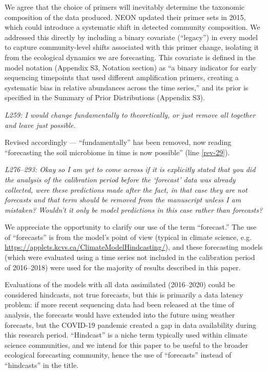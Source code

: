 \documentclass[11pt]{article}
\begin{document}
We agree that the choice of primers will inevitably determine the taxonomic composition of the data produced. NEON updated their primer sets in 2015, which could introduce a systematic shift in detected community composition. We addressed this directly by including a binary covariate (``legacy'') in every model to capture community-level shifts associated with this primer change, isolating it from the ecological dynamics we are forecasting. This covariate is defined in the model notation (Appendix S3, Notation section) as ``a binary indicator for early sequencing timepoints that used different amplification primers, creating a systematic bias in relative abundances across the time series,'' and its prior is specified in the Summary of Prior Distributions (Appendix S3).

\bigskip

\textit{L259: I would change fundamentally to theoretically, or just remove all together and leave just possible.}

Revised accordingly --- ``fundamentally'' has been removed, now reading ``forecasting the soil microbiome in time is now possible'' (line \ref{rev-29}).

\bigskip

\textit{L276--293: Okay so I am yet to come across if it is explicitly stated that you did the analysis of the calibration period before the `forecast' data was already collected, were these predictions made after the fact, in that case they are not forecasts and that term should be removed from the manuscript unless I am mistaken? Wouldn't it only be model predictions in this case rather than forecasts?}

We appreciate the opportunity to clarify our use of the term ``forecast.'' The use of ``forecasts'' is from the model's point of view (typical in climate science, e.g. \url{https://applets.kcvs.ca/ClimateModelHindcasting/}), and these forecasting models (which were evaluated using a time series not included in the calibration period of 2016--2018) were used for the majority of results described in this paper.

Evaluations of the models with all data assimilated (2016--2020) could be considered hindcasts, not true forecasts, but this is primarily a data latency problem: if more recent sequencing data had been released at the time of analysis, the forecasts would have extended into the future using weather forecasts, but the COVID-19 pandemic created a gap in data availability during this research period. ``Hindcast'' is a niche term typically used within climate science communities, and we intend for this paper to be useful to the broader ecological forecasting community, hence the use of ``forecasts'' instead of ``hindcasts'' in the title.
\end{document}
